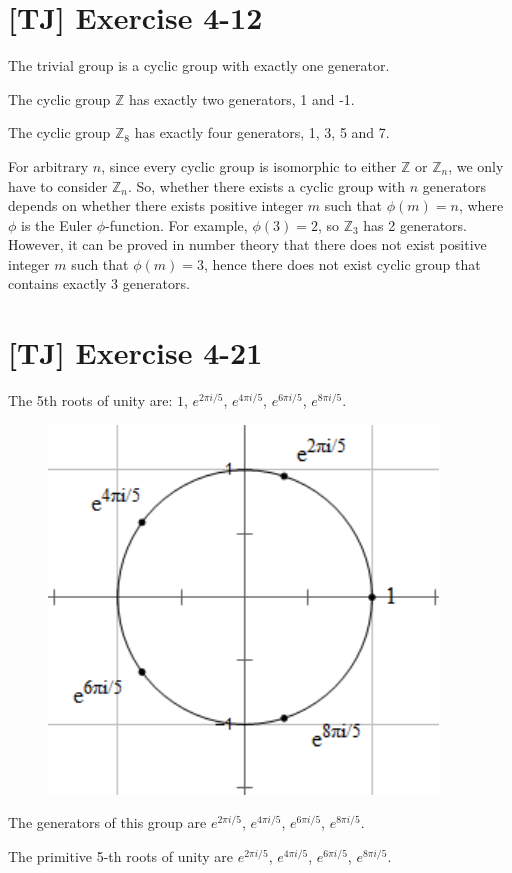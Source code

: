 \documentclass[a4paper,11pt,twocolumn]{article}
\begin{document}
  \section{[TJ] Exercise 4-12}
  The trivial group is a cyclic group with exactly one generator. \par
  The cyclic group $\mathbb{Z}$ has exactly two generators, 1 and -1. \par
  The cyclic group $\mathbb{Z}_8$ has exactly four generators, 1, 3, 5 and 7. \par
  For arbitrary $n$, since every cyclic group is isomorphic to either $\mathbb{Z}$ or $\mathbb{Z}_n$, we only have to consider $\mathbb{Z}_n$. So, whether there exists a cyclic group with $n$ generators depends on whether there exists positive integer $m$ such that $\phi(m) = n$, where $\phi$ is the Euler $\phi$-function. For example, $\phi(3) = 2$, so $\mathbb{Z}_3$ has 2 generators. However, it can be proved in number theory that there does not exist positive integer $m$ such that $\phi(m) = 3$, hence there does not exist cyclic group that contains exactly 3 generators.

  \section{[TJ] Exercise 4-21}
  The 5th roots of unity are: $1$, $e^{2\pi i/5}$, $e^{4\pi i/5}$, $e^{6\pi i/5}$, $e^{8\pi i/5}$. \par
  \begin{figure}[h]
    \centering
    \includegraphics{root5.png}
  \end{figure}
  The generators of this group are $e^{2\pi i/5}$, $e^{4\pi i/5}$, $e^{6\pi i/5}$, $e^{8\pi i/5}$. \par
  The primitive 5-th roots of unity are $e^{2\pi i/5}$, $e^{4\pi i/5}$, $e^{6\pi i/5}$, $e^{8\pi i/5}$.
\end{document}
